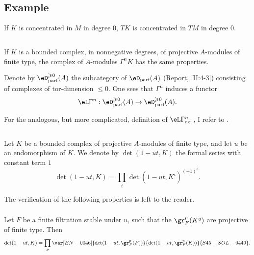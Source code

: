 \subsection{Example}\label{III:1-5}

If $K$ is concentrated in $M$ in degree $0$, $T K$ is concentrated in $T M$
in degree $0$.






\subsection{}\label{III:1-6}

If $K$ is a bounded complex, in nonnegative degrees, of projective
$A$-modules of finite type, the complex of $A$-modules $\Gamma^n K$ has the
same properties.

Denote by $\eD_\text{parf}^{\geqslant 0}(A)$ the subcategory of
$\eD_\text{parf}(A)$ (Report, \ref{II:4-3}) consisting of complexes of
tor-dimension $\leqslant 0$. One sees that $\Gamma^n$ induces a functor
\[
  \eL\Gamma^n : \eD_\text{parf}^{\geqslant 0}(A) \to \eD_\text{parf}^{\geqslant 0}(A) \text{.}
\]

For the analogous, but more complicated, definition of
$\eL\Gamma_\text{ext}^n$, I refer to .






\subsection{}\label{III:1-7}

Let $K$ be a bounded complex of projective $A$-modules of finite type, and let
$u$ be an endomorphism of $K$. We denote by $\det(1-u t,K)$ the formal series
with constant term $1$
\[
  \det(1-u t,K) = \prod_i \det(1-u t,K^i)^{(-1)^i} \text{.}
\]

The verification of the following properties is left to the reader.


\subsubsection{}\label{III:1-7-1}

Let $F$ be a finite filtration stable under $u$, such that the
$\gr_F^p(K^q)$ are projective of finite type. Then
\[
  \det(1-u t,K) = \prod_p \var[EN-0046]{\det(1-u t,\gr_F^p(F))}{\det(1-u t,\gr_F^p(K))}{S45-SOL-0449} \text{.}
\]


